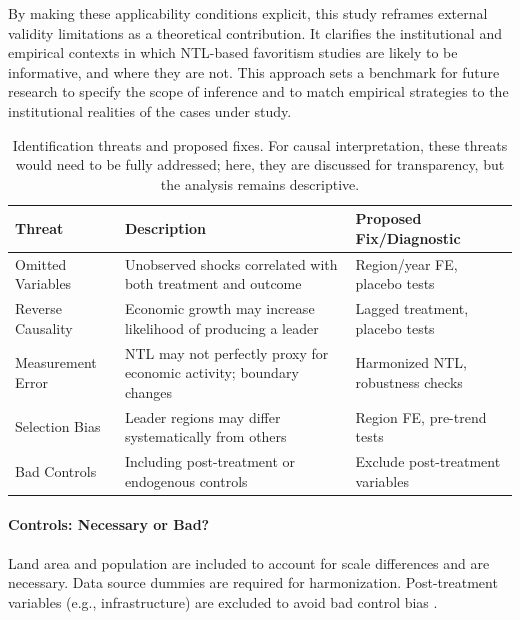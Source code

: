 \documentclass[12pt,a4paper]{article}
\begin{document}
By making these applicability conditions explicit, this study reframes external validity limitations as a theoretical contribution. It clarifies the institutional and empirical contexts in which NTL-based favoritism studies are likely to be informative, and where they are not. This approach sets a benchmark for future research to specify the scope of inference and to match empirical strategies to the institutional realities of the cases under study.
\begin{table}[ht]
\centering
\begin{tabular}{p{3.5cm} p{7.5cm} p{5.5cm}}
\toprule
\textbf{Threat} & \textbf{Description} & \textbf{Proposed Fix/Diagnostic} \\
\midrule
Omitted Variables & Unobserved shocks correlated with both treatment and outcome & Region/year FE, placebo tests \\
Reverse Causality & Economic growth may increase likelihood of producing a leader & Lagged treatment, placebo tests \\
Measurement Error & NTL may not perfectly proxy for economic activity; boundary changes & Harmonized NTL, robustness checks \\
Selection Bias & Leader regions may differ systematically from others & Region FE, pre-trend tests \\
Bad Controls & Including post-treatment or endogenous controls & Exclude post-treatment variables \\
\bottomrule
\end{tabular}
\caption{Identification threats and proposed fixes. For causal interpretation, these threats would need to be fully addressed; here, they are discussed for transparency, but the analysis remains descriptive.}
\end{table}

\paragraph{Controls: Necessary or Bad?}
Land area and population are included to account for scale differences and are necessary. Data source dummies are required for harmonization. Post-treatment variables (e.g., infrastructure) are excluded to avoid bad control bias \citep{Angrist2009}.
\end{document}
